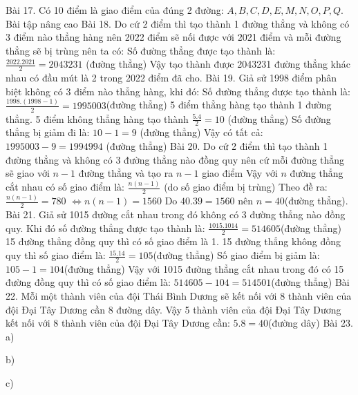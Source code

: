 Bài 17. Có 10 điểm là giao điểm của đúng 2 đường: $A,B,C,D,E,M,N,O,P,Q.$
Bài tập nâng cao
Bài 18. Do cứ 2 điểm thì tạo thành 1 đường thẳng và không có 3 điểm nào thẳng hàng nên 2022 điểm sẽ nối được với 2021 điểm và mỗi đường thẳng sẽ bị trùng nên ta có: 
Số đường thẳng được tạo thành là: $\frac{2022.2021}{2}=2043231$ (đường thẳng)
Vậy tạo thành được 2043231 đường thẳng khác nhau có đầu mút là 2 trong 2022 điểm đã cho.
Bài 19. Giả sử 1998 điểm phân biệt không có 3 điểm nào thẳng hàng, khi đó: 
Số đường thẳng được tạo thành là: $\frac{1998.(1998-1)}{2}=1995003$(đường thẳng)
5 điểm thẳng hàng tạo thành 1 đường thẳng.
5 điểm không thẳng hàng tạo thành $\frac{5.4}{2}=10$ (đường thẳng)
Số đường thẳng bị giảm đi là: $10-1=9$ (đường thẳng)
Vậy có tất cả: $1995003-9=1994994$ (đường thẳng)
Bài 20. Do cứ 2 điểm thì tạo thành 1 đường thẳng và không có 3 đường thẳng nào đồng quy nên cứ mỗi đường thẳng sẽ giao với $n-1$ đường thẳng và tạo ra $n-1$ giao điểm 
Vậy với $n$ đường thẳng cắt nhau có số giao điểm là: $\frac{n(n-1)}{2}$ (do số giao điểm bị trùng)
Theo đề ra: $\frac{n(n-1)}{2}=780$
$\Leftrightarrow n(n-1)=1560$
Do $40.39=1560$ nên $n=40$(đường thẳng).
Bài 21. Giả sử 1015 đường cắt nhau trong đó không có 3 đường thẳng nào đồng quy. Khi đó số đường thẳng được tạo thành là: $\frac{1015.1014}{2}=514605$(đường thẳng)
15 đường thẳng đồng quy thì có số giao điểm là 1.
15 đường thẳng không đồng quy thì số giao điểm là: $\frac{15.14}{2}=105$(đường thẳng)
Số giao điểm bị giảm là: $105-1=104$(đường thẳng)
Vậy với 1015 đường thẳng cắt nhau trong đó có 15 đường đồng quy thì có số giao điểm là: $514605-104=514501$(đường thẳng)
Bài 22. Mỗi một thành viên của đội Thái Bình Dương sẽ kết nối với 8 thành viên của đội Đại Tây Dương cần 8 đường dây.
Vậy 5 thành viên của đội Đại Tây Dương kết nối với 8 thành viên của đội Đại Tây Dương cần: $5.8=40$(đường dây)
Bài 23. 
a) 

b) 

c) 

$$

